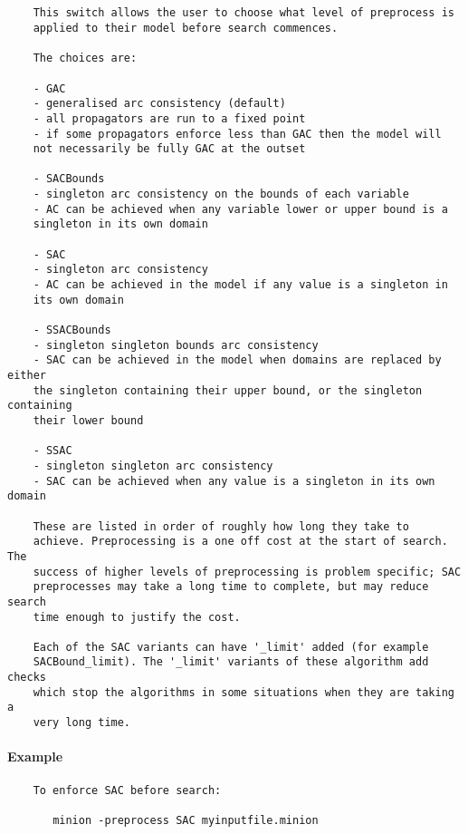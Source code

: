 \paragraph{}
{\footnotesize
\begin{verbatim}

    This switch allows the user to choose what level of preprocess is
    applied to their model before search commences.

    The choices are:

    - GAC
    - generalised arc consistency (default)
    - all propagators are run to a fixed point
    - if some propagators enforce less than GAC then the model will
    not necessarily be fully GAC at the outset

    - SACBounds
    - singleton arc consistency on the bounds of each variable
    - AC can be achieved when any variable lower or upper bound is a
    singleton in its own domain

    - SAC
    - singleton arc consistency
    - AC can be achieved in the model if any value is a singleton in
    its own domain

    - SSACBounds
    - singleton singleton bounds arc consistency
    - SAC can be achieved in the model when domains are replaced by either
    the singleton containing their upper bound, or the singleton containing
    their lower bound

    - SSAC
    - singleton singleton arc consistency
    - SAC can be achieved when any value is a singleton in its own domain

    These are listed in order of roughly how long they take to
    achieve. Preprocessing is a one off cost at the start of search. The
    success of higher levels of preprocessing is problem specific; SAC
    preprocesses may take a long time to complete, but may reduce search
    time enough to justify the cost.

    Each of the SAC variants can have '_limit' added (for example 
    SACBound_limit). The '_limit' variants of these algorithm add checks
    which stop the algorithms in some situations when they are taking a
    very long time.
\end{verbatim}
}
\paragraph{Example}
{\footnotesize
\begin{verbatim}
    To enforce SAC before search:

       minion -preprocess SAC myinputfile.minion
\end{verbatim}
}
